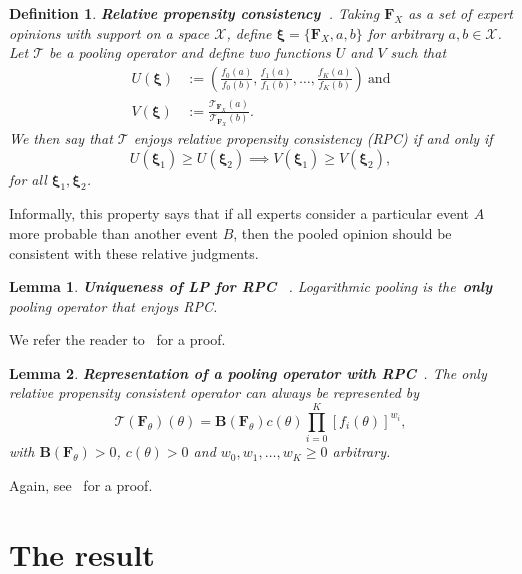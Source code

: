 \documentclass[a4paper, notitlepage, 10pt]{article}
\newtheorem{definition}{Definition}[]
\newtheorem{lemma}{Lemma}[]
\begin{document}
\begin{definition}
\label{def:RPC}
\textbf{Relative propensity consistency~\citep{genest1984}}.
Taking $\boldsymbol F_{X}$ as a set of expert opinions with support on a space $\mathcal{X}$, define $\boldsymbol \xi = \{\boldsymbol F_{X}, a, b\}$ for arbitrary $a , b \in \mathcal{X}$.
Let $\mathcal{T}$ be a pooling operator and define two functions $U$ and $V$ such that 
\begin{align}
 U(\boldsymbol \xi) &:= \left( \frac{f_0(a)}{f_0(b)}, \frac{f_1(a)}{f_1(b)}, \ldots, \frac{f_K(a)}{f_K(b)} \right)\:\text{and}\\
 V(\boldsymbol \xi) & := \frac{\mathcal{T}_{\boldsymbol F_{X}} (a)}{\mathcal{T}_{\boldsymbol F_{X}} (b)}.
\end{align}
We then say that $\mathcal{T}$ enjoys \textit{relative propensity consistency} (RPC) if and only if
\begin{equation}
 U(\boldsymbol \xi_1) \geq U(\boldsymbol \xi_2) \implies  V(\boldsymbol \xi_1) \geq V(\boldsymbol \xi_2),
\end{equation}
for all $\boldsymbol \xi_1, \boldsymbol \xi_2$.
\end{definition}
Informally, this property says that if all experts consider a particular event $A$ more probable than another event $B$, then the pooled opinion should be consistent with these relative judgments. 

\begin{lemma}
\label{lem:RPC_LP}
\textbf{Uniqueness of LP for RPC }~\citep{genest1984}.
Logarithmic pooling is the~\textbf{only} pooling operator that enjoys RPC.
\end{lemma}
We refer the reader to~\cite{genest1984} for a proof.

\begin{lemma}
\label{lem:RPC_representation}
\textbf{Representation of a pooling operator with RPC}~\citep[eq. 3.1]{genest1984}.
The only relative propensity consistent operator can always be represented by
\[ \mathcal{T} \left( \boldsymbol F_\theta \right)(\theta) = \boldsymbol B\left( \boldsymbol F_\theta \right) c(\theta) \prod_{i=0}^K \left[f_i(\theta) \right]^{w_i},\]
with $\boldsymbol B\left( \boldsymbol F_\theta \right) > 0$, $c(\theta) >0$  and $w_0, w_1, \ldots, w_K \geq 0$ arbitrary. 
\end{lemma}
Again, see~\cite{genest1984} for a proof.

\section*{The result}
\end{document}
